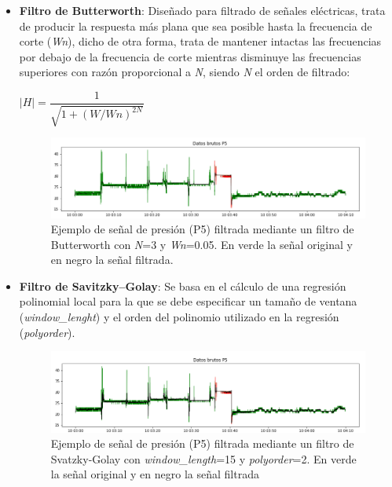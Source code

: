 \begin{itemize}
	\item \textbf{Filtro de Butterworth}: Diseñado para filtrado de señales eléctricas, trata de producir la respuesta más plana que sea posible hasta la frecuencia de corte (\textit{Wn}), dicho de otra forma, trata de mantener intactas las frecuencias por debajo de la frecuencia de corte mientras disminuye las frecuencias superiores con razón proporcional a \textit{N}, siendo \textit{N} el orden de filtrado:
	\begin{center}
		$|H| = \dfrac{1}{\sqrt{1+(W/Wn)^{2N}}}$
	\end{center}

	\begin{figure}[H]
		\centering
		\includegraphics[width=1\textwidth]{../img/senalP5butter.png}
		\caption{Ejemplo de señal de presión (P5) filtrada mediante un filtro de Butterworth con \textit{N}=3 y \textit{Wn}=0.05. En verde la señal original y en negro la señal filtrada.}
		\label{fig:senalP5butter}
	\end{figure}
	
	\item \textbf{Filtro de Savitzky–Golay}: Se basa en el cálculo de una regresión polinomial local para la que se debe especificar un tamaño de ventana (\textit{window\_lenght}) y el orden del polinomio utilizado en la regresión (\textit{polyorder}). 
	
	\begin{figure}[H]
		\centering
		\includegraphics[width=1\textwidth]{../img/senalP5savgol.png}
		\caption{Ejemplo de señal de presión (P5) filtrada mediante un filtro de Svatzky-Golay con \textit{window\_length}=15 y \textit{polyorder}=2. En verde la señal original y en negro la señal filtrada}
		\label{fig:senalP5savgol}
	\end{figure}
\end{itemize}

